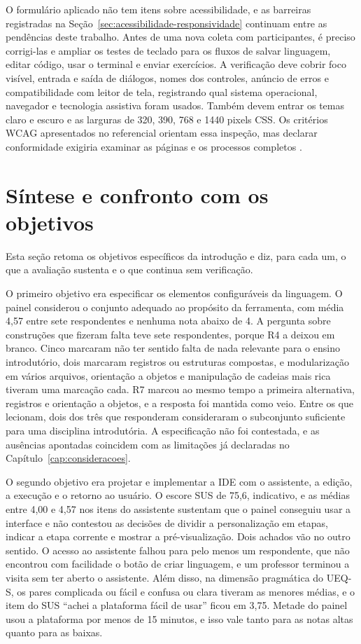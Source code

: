 O formulário aplicado não tem itens sobre acessibilidade, e as barreiras registradas na Seção~\ref{sec:acessibilidade-responsividade} continuam entre as pendências deste trabalho. Antes de uma nova coleta com participantes, é preciso corrigi-las e ampliar os testes de teclado para os fluxos de salvar linguagem, editar código, usar o terminal e enviar exercícios. A verificação deve cobrir foco visível, entrada e saída de diálogos, nomes dos controles, anúncio de erros e compatibilidade com leitor de tela, registrando qual sistema operacional, navegador e tecnologia assistiva foram usados. Também devem entrar os temas claro e escuro e as larguras de 320, 390, 768 e 1440 pixels CSS. Os critérios WCAG apresentados no referencial orientam essa inspeção, mas declarar conformidade exigiria examinar as páginas e os processos completos \cite{w3cwcag22,w3capg2026}.

\section{Síntese e confronto com os objetivos}
\label{sec:resultado-sintese}

Esta seção retoma os objetivos específicos da introdução e diz, para cada um, o que a avaliação sustenta e o que continua sem verificação.

O primeiro objetivo era especificar os elementos configuráveis da linguagem. O painel considerou o conjunto adequado ao propósito da ferramenta, com média 4,57 entre sete respondentes e nenhuma nota abaixo de 4. A pergunta sobre construções que fizeram falta teve sete respondentes, porque R4 a deixou em branco. Cinco marcaram não ter sentido falta de nada relevante para o ensino introdutório, dois marcaram registros ou estruturas compostas, e modularização em vários arquivos, orientação a objetos e manipulação de cadeias mais rica tiveram uma marcação cada. R7 marcou ao mesmo tempo a primeira alternativa, registros e orientação a objetos, e a resposta foi mantida como veio. Entre os que lecionam, dois dos três que responderam consideraram o subconjunto suficiente para uma disciplina introdutória. A especificação não foi contestada, e as ausências apontadas coincidem com as limitações já declaradas no Capítulo~\ref{cap:consideracoes}.

O segundo objetivo era projetar e implementar a IDE com o assistente, a edição, a execução e o retorno ao usuário. O escore SUS de 75,6, indicativo, e as médias entre 4,00 e 4,57 nos itens do assistente sustentam que o painel conseguiu usar a interface e não contestou as decisões de dividir a personalização em etapas, indicar a etapa corrente e mostrar a pré-visualização. Dois achados vão no outro sentido. O acesso ao assistente falhou para pelo menos um respondente, que não encontrou com facilidade o botão de criar linguagem, e um professor terminou a visita sem ter aberto o assistente. Além disso, na dimensão pragmática do UEQ-S, os pares complicada ou fácil e confusa ou clara tiveram as menores médias, e o item do SUS ``achei a plataforma fácil de usar'' ficou em 3,75. Metade do painel usou a plataforma por menos de 15 minutos, e isso vale tanto para as notas altas quanto para as baixas.

